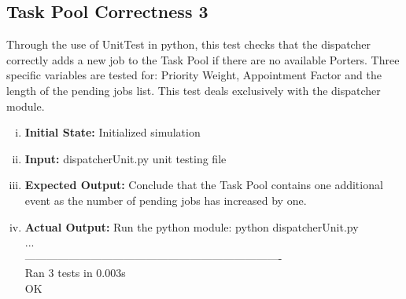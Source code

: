\documentclass[paper=letter, fontsize=10pt]{scrartcl}
\numberwithin{equation}{section}		%
\numberwithin{figure}{section}			%
\numberwithin{table}{section}				%
\begin{document}
\subsection{Task Pool Correctness 3}
Through the use of UnitTest in python, this test checks that the dispatcher correctly adds a new job to the Task Pool if there are no available Porters. Three specific variables are tested for: Priority Weight, Appointment Factor and the length of the pending jobs list. This test deals exclusively with the dispatcher module.
\begin{enumerate}[(i)]
	\item \textbf{Initial State:} Initialized simulation
	\item \textbf{Input:} dispatcherUnit.py unit testing file %
	\item \textbf{Expected Output:} Conclude that the Task Pool contains one additional event as the number of pending jobs has increased by one.
	\item \textbf{Actual Output:} Run the python module: python dispatcherUnit.py\\
...\\
----------------------------------------------------------------------\\
Ran 3 tests in 0.003s\\

OK
\end{enumerate}
\end{document}
